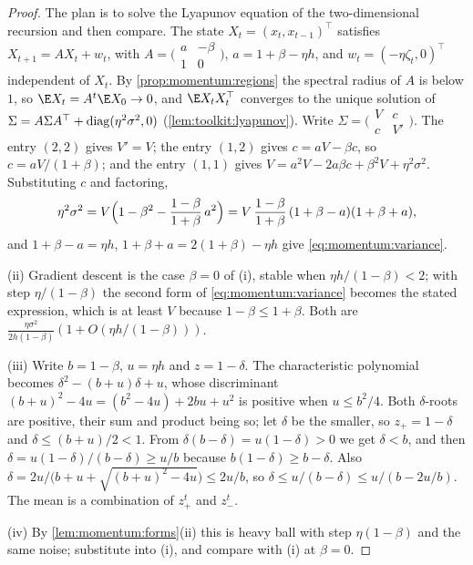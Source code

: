 \begin{refsection}
\begin{proof}
The plan is to solve the Lyapunov equation of the two-dimensional recursion and then compare. The state $X_t=(x_t,x_{t-1})^\top$ satisfies $X_{t+1}=AX_t+w_t$, with $A=\bigl(\begin{smallmatrix}a&-\beta\\1&0\end{smallmatrix}\bigr)$, $a=1+\beta-\eta h$, and $w_t=(-\eta\zeta_t,0)^\top$ independent of $X_t$. By \cref{prop:momentum:regions} the spectral radius of $A$ is below $1$, so $\E X_t=A^t\E X_0\to0$, and $\E X_tX_t^\top$ converges to the unique solution of $\Sigma=A\Sigma A^\top+\operatorname{diag}(\eta^2\sigma^2,0)$ (\cref{lem:toolkit:lyapunov}). Write $\Sigma=\bigl(\begin{smallmatrix}V&c\\c&V'\end{smallmatrix}\bigr)$. The entry $(2,2)$ gives $V'=V$; the entry $(1,2)$ gives $c=aV-\beta c$, so $c=aV/(1+\beta)$; and the entry $(1,1)$ gives $V=a^2V-2a\beta c+\beta^2V+\eta^2\sigma^2$. Substituting $c$ and factoring,
\[
  \eta^2\sigma^2=V\Bigl(1-\beta^2-\frac{1-\beta}{1+\beta}\,a^2\Bigr)=V\,\frac{1-\beta}{1+\beta}\,(1+\beta-a)(1+\beta+a),
\]
and $1+\beta-a=\eta h$, $1+\beta+a=2(1+\beta)-\eta h$ give \eqref{eq:momentum:variance}.

(ii) Gradient descent is the case $\beta=0$ of (i), stable when $\eta h/(1-\beta)<2$; with step $\eta/(1-\beta)$ the second form of \eqref{eq:momentum:variance} becomes the stated expression, which is at least $V$ because $1-\beta\le1+\beta$. Both are $\frac{\eta\sigma^2}{2h(1-\beta)}(1+O(\eta h/(1-\beta)))$.

(iii) Write $b=1-\beta$, $u=\eta h$ and $z=1-\delta$. The characteristic polynomial becomes $\delta^2-(b+u)\delta+u$, whose discriminant $(b+u)^2-4u=(b^2-4u)+2bu+u^2$ is positive when $u\le b^2/4$. Both $\delta$-roots are positive, their sum and product being so; let $\delta$ be the smaller, so $z_+=1-\delta$ and $\delta\le(b+u)/2<1$. From $\delta(b-\delta)=u(1-\delta)>0$ we get $\delta<b$, and then $\delta=u(1-\delta)/(b-\delta)\ge u/b$ because $b(1-\delta)\ge b-\delta$. Also $\delta=2u/\bigl(b+u+\sqrt{(b+u)^2-4u}\bigr)\le2u/b$, so $\delta\le u/(b-\delta)\le u/(b-2u/b)$. The mean is a combination of $z_+^t$ and $z_-^t$.

(iv) By \cref{lem:momentum:forms}(ii) this is heavy ball with step $\eta(1-\beta)$ and the same noise; substitute into (i), and compare with (i) at $\beta=0$.
\end{proof}


\end{refsection}
